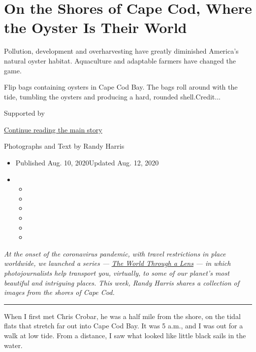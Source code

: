 \hypertarget{on-the-shores-of-cape-cod-where-the-oyster-is-their-world}{%
\section{On the Shores of Cape Cod, Where the Oyster Is Their
World}\label{on-the-shores-of-cape-cod-where-the-oyster-is-their-world}}

Pollution, development and overharvesting have greatly diminished
America's natural oyster habitat. Aquaculture and adaptable farmers have
changed the game.

Flip bags containing oysters in Cape Cod Bay. The bags roll around with
the tide, tumbling the oysters and producing a hard, rounded
shell.Credit...

Supported by

\protect\hyperlink{after-sponsor}{Continue reading the main story}

Photographs and Text by Randy Harris

\begin{itemize}
\item
  Published Aug. 10, 2020Updated Aug. 12, 2020
\item
  \begin{itemize}
  \item
  \item
  \item
  \item
  \item
  \item
  \end{itemize}
\end{itemize}

\emph{At the onset of the coronavirus pandemic, with travel restrictions
in place worldwide, we launched a series ---}
\href{https://www.nytimes3xbfgragh.onion/column/the-world-through-a-lens}{\emph{The
World Through a Lens}} \emph{--- in which photojournalists help
transport you, virtually, to some of our planet's most beautiful and
intriguing places. This week, Randy Harris shares a collection of images
from the shores of Cape Cod.}

\begin{center}\rule{0.5\linewidth}{\linethickness}\end{center}

When I first met Chris Crobar, he was a half mile from the shore, on the
tidal flats that stretch far out into Cape Cod Bay. It was 5 a.m., and I
was out for a walk at low tide. From a distance, I saw what looked like
little black sails in the water.

